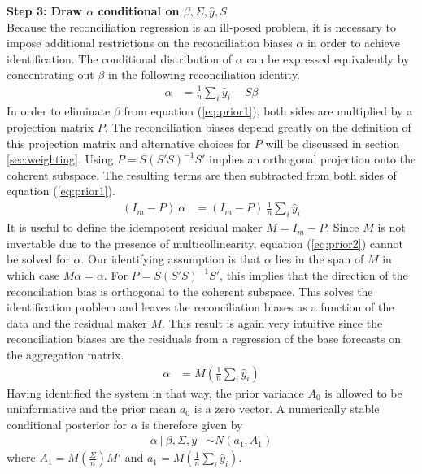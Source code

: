 \documentclass[a4paper,fleqn,11pt]{article}
\begin{document}
\noindent\textbf{Step 3: Draw $\alpha$ conditional on $\beta,\Sigma,\hat{y},S$}\\
Because the reconciliation regression is an ill-posed problem, it is necessary to impose additional restrictions on the reconciliation biases $\alpha$ in order to achieve identification. The conditional distribution of $\alpha$ can be expressed equivalently by concentrating out $\beta$ in the following reconciliation identity.
\begin{align}
	\label{eq:prior1}
	\alpha &= \frac{1}{n}\sum_i \hat{y}_i - S\beta
\end{align}
In order to eliminate $\beta$ from equation (\ref{eq:prior1}), both sides are multiplied by a projection matrix $P$. The reconciliation biases depend greatly on the definition of this projection matrix and alternative choices for $P$ will be discussed in section \ref{sec:weighting}. Using $P = S(S'S)^{-1}S'$ implies an orthogonal projection onto the coherent subspace. The resulting terms are then subtracted from both sides of equation (\ref{eq:prior1}).
\begin{align}
	\label{eq:prior2}
	(I_m - P)\ \alpha &= (I_m - P)\ \frac{1}{n}\sum_i \hat{y}_i  
\end{align}
It is useful to define the idempotent residual maker $M = I_m - P$. Since $M$ is not invertable due to the presence of multicollinearity, equation (\ref{eq:prior2}) cannot be solved for $\alpha$. Our identifying assumption is that $\alpha$ lies in the span of $M$ in which case $M\alpha = \alpha$. For $P=S(S'S)^{-1}S'$, this implies that the direction of the reconciliation bias is orthogonal to the coherent subspace.  This solves the identification problem and leaves the reconciliation biases as a function of the data and the residual maker $M$. This result is again very intuitive since the reconciliation biases are the residuals from a regression of the base forecasts on the aggregation matrix.
\begin{align}
\alpha &= M\left(\frac{1}{n}\sum_i \hat{y}_i\right)
\end{align}
 Having identified the system in that way, the prior variance $A_0$ is allowed to be uninformative and the prior mean $a_0$ is a zero vector. A numerically stable conditional posterior for $\alpha$ is therefore given by
\begin{align}
	\label{eq:alpha}
	\alpha\ |\ \beta,\Sigma,\hat{y} &\sim N(a_1,A_1)
\end{align}
where $A_1 = M\left(\frac{\Sigma}{n}\right)M'$ and $a_1 = M\left(\frac{1}{n}\sum_i \hat{y}_i\right)$. 
\end{document}
